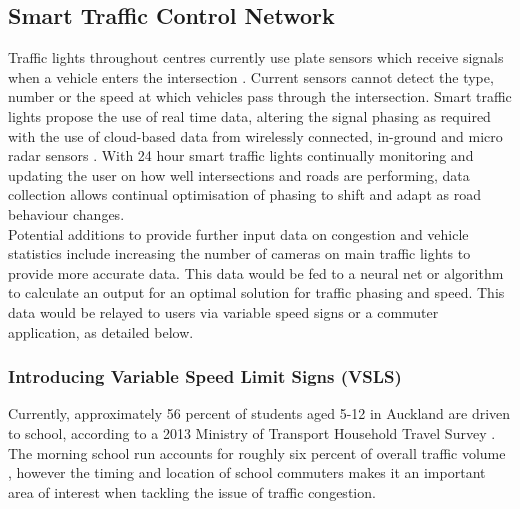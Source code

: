 \documentclass[twoside, a4paper, 11pt]{article}
\begin{document}
\subsection{Smart Traffic Control Network}
Traffic lights throughout centres currently use plate sensors which receive signals when a vehicle enters the intersection \citep{ATND}. Current sensors cannot detect the type, number or the speed at which vehicles pass through the intersection. Smart traffic lights propose the use of real time data, altering the signal phasing as required with the use of cloud-based data from wirelessly connected, in-ground and micro radar sensors \citep{verizon16}. With 24 hour smart traffic lights continually monitoring and updating the user on how well intersections and roads are performing, data collection allows continual optimisation of phasing to shift and adapt as road behaviour changes.
\\Potential additions to provide further input data on congestion and vehicle statistics include increasing the number of cameras on main traffic lights to provide more accurate data. This data would be fed to a neural net or algorithm to calculate an output for an optimal solution for traffic phasing and speed. This data would be relayed to users via variable speed signs or a commuter application, as detailed below.

\subsubsection{Introducing Variable Speed Limit Signs (VSLS)}
Currently, approximately 56 percent of students aged 5-12 in Auckland are driven to school, according to a 2013 Ministry of Transport Household Travel Survey \citep{mot14}. The morning school run accounts for roughly six percent of overall traffic volume \citep{mot09} , however the timing and location of school commuters makes it an important area of interest when tackling the issue of traffic congestion.
\end{document}
